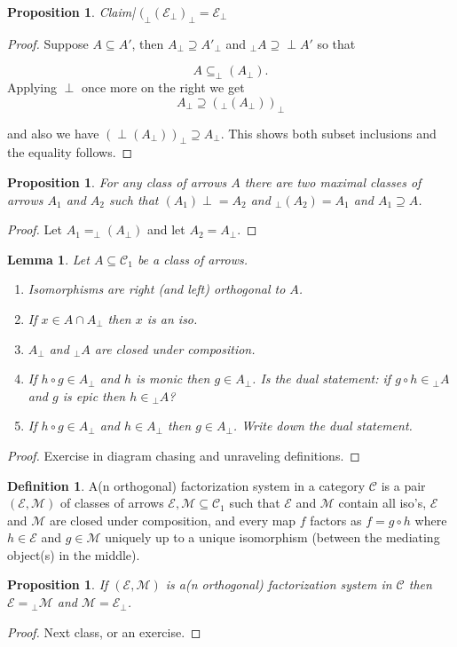 \documentclass[11pt]{amsart}
\theoremstyle{plain}
\newtheorem{prop}[thm]{Proposition}
\newtheorem{lem}[thm]{Lemma}
\theoremstyle{definition}
\newtheorem{defn}[thm]{Definition}
\newcommand{\cC}{{\mathcal C}}
\newcommand{\cE}{{\mathcal E}}
\newcommand{\cM}{{\mathcal M}}
\newcommand{\noi}{{\noindent}}
\begin{document}
\begin{prop}
Claim| $( _\perp(\cE_\perp) _\perp = \cE_\perp$
\end{prop}
\begin{proof}
Suppose $A \subseteq A'$, then $A_\perp \supseteq A'_\perp$ and $_\perp A \supseteq \perp A'$ so that 

\[ A \subseteq _\perp(A_\perp). \]
\noi Applying $\perp$ once more on the right we get 
\[ A_\perp \supseteq (_\perp (A_\perp))_\perp \]

\noi and also we have $(\perp(A_\perp))_\perp \supseteq A_\perp$. This shows both subset inclusions and the equality follows. 
\end{proof}

\begin{prop}
For any class of arrows $A$ there are two maximal classes of arrows $A_1$ and $A_2$ such that $(A_1)\perp = A_2$ and $_\perp(A_2) = A_1$ and $A_1 \supseteq A$. 
\end{prop}
\begin{proof}
Let $A_1 = _\perp (A_\perp)$ and let $A_2 = A_\perp$. 
\end{proof}

\begin{lem}
  Let $A \subseteq \cC_1$ be a class of arrows.
\begin{enumerate}
\item Isomorphisms are right (and left) orthogonal to $A$. \medskip 
\item If $x \in A \cap A_\perp$ then $x$ is an iso. \medskip
\item $A_\perp$ and ${_\perp}A$ are closed under composition. \medskip
\item If $h \circ g \in A_\perp$ and $h$ is monic then $g \in A_\perp$. Is the dual statement: if $g \circ h \in {_\perp}A$ and $g$ is epic then $h \in  {_\perp}A$?  \medskip
\item If $h \circ g \in A_\perp$ and $h \in A_\perp$ then $g \in A_\perp$. Write down the dual statement. 
\end{enumerate}
\end{lem}
\begin{proof}
Exercise in diagram chasing and unraveling definitions. 
\end{proof}

\begin{defn}
A(n orthogonal) factorization system in a category $\cC$ is a pair $(\cE, \cM)$ of classes of arrows $\cE, \cM \subseteq \cC_1$ such that $\cE$ and $\cM$ contain all iso's, $\cE$ and $\cM$ are closed under composition, and every map $f$ factors as $f = g \circ h$ where $h \in \cE$ and $g \in \cM$ uniquely up to a unique isomorphism (between the mediating object(s) in the middle). 
\end{defn}


\begin{prop}
If $(\cE, \cM)$ is a(n orthogonal) factorization system in $\cC$ then $\cE = {_\perp}\cM$ and $\cM = \cE_\perp$. 
\end{prop}
\begin{proof}
Next class, or an exercise. 
\end{proof}
\end{document}

